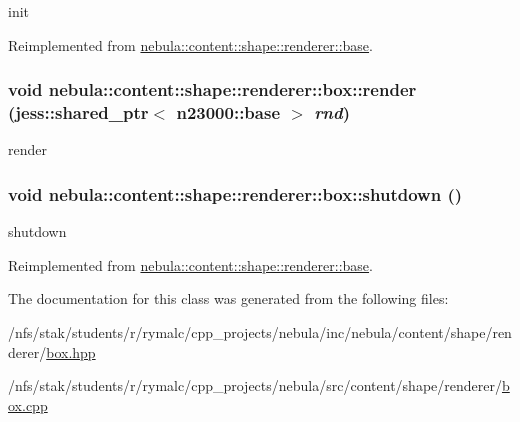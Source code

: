 init 

Reimplemented from \hyperlink{classnebula_1_1content_1_1shape_1_1renderer_1_1base_a23ca4a9ed061df97755b6d845533ce1f}{nebula::content::shape::renderer::base}.\hypertarget{classnebula_1_1content_1_1shape_1_1renderer_1_1box_a9f5273c402681016abf485410e89fa4b}{
\subsubsection[{render}]{\setlength{\rightskip}{0pt plus 5cm}void nebula::content::shape::renderer::box::render (jess::shared\_\-ptr$<$ {\bf n23000::base} $>$ {\em rnd})}}
\label{classnebula_1_1content_1_1shape_1_1renderer_1_1box_a9f5273c402681016abf485410e89fa4b}


render \hypertarget{classnebula_1_1content_1_1shape_1_1renderer_1_1box_a06588ac2d7fd76ec8589aaeab56b6389}{
\subsubsection[{shutdown}]{\setlength{\rightskip}{0pt plus 5cm}void nebula::content::shape::renderer::box::shutdown ()}}
\label{classnebula_1_1content_1_1shape_1_1renderer_1_1box_a06588ac2d7fd76ec8589aaeab56b6389}


shutdown 

Reimplemented from \hyperlink{classnebula_1_1content_1_1shape_1_1renderer_1_1base_a3e5311f8c103a0ae28e20c4145737cf8}{nebula::content::shape::renderer::base}.

The documentation for this class was generated from the following files:\begin{DoxyCompactItemize}
\item 
/nfs/stak/students/r/rymalc/cpp\_\-projects/nebula/inc/nebula/content/shape/renderer/\hyperlink{renderer_2box_8hpp}{box.hpp}\item 
/nfs/stak/students/r/rymalc/cpp\_\-projects/nebula/src/content/shape/renderer/\hyperlink{renderer_2box_8cpp}{box.cpp}\end{DoxyCompactItemize}
